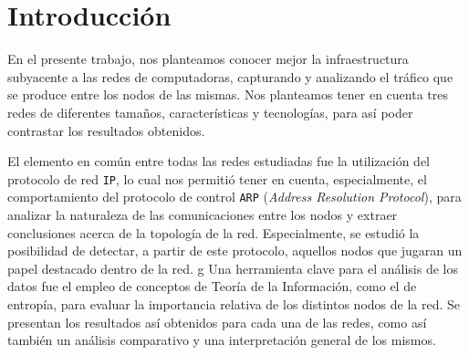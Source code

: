 
\section{Introducción}

En el presente trabajo, nos planteamos conocer mejor la infraestructura
subyacente a las redes de computadoras, capturando y analizando el tráfico que
se produce entre los nodos de las mismas. Nos planteamos tener en cuenta tres
redes de diferentes tamaños, características y tecnologías, para así poder
contrastar los resultados obtenidos.

El elemento en común entre todas las redes estudiadas fue la utilización del
protocolo de red \texttt{IP}, lo cual nos permitió tener en cuenta,
especialmente, el comportamiento del protocolo de control \texttt{ARP}
(\textit{Address Resolution Protocol}), para analizar la naturaleza de las
comunicaciones entre los nodos y extraer conclusiones acerca de la topología
de la red. Especialmente, se estudió la posibilidad de detectar, a partir de
este protocolo, aquellos nodos que jugaran un papel destacado dentro de la
red.
g
Una herramienta clave para el análisis de los datos fue el empleo de conceptos
de Teoría de la Información, como el de entropía, para evaluar la importancia
relativa de los distintos nodos de la red. Se presentan los resultados así
obtenidos para cada una de las redes, como así también un análisis comparativo
y una interpretación general de los mismos.
